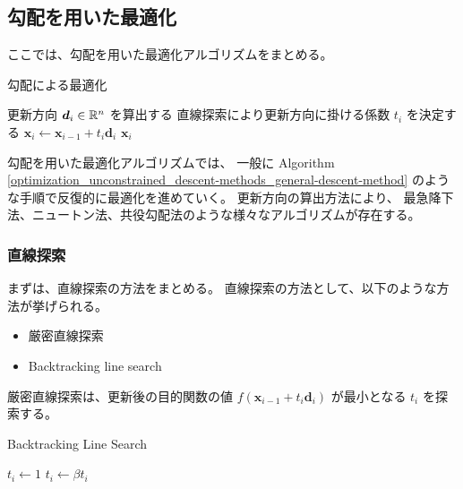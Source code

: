 %

\subsection{勾配を用いた最適化}

ここでは、勾配を用いた最適化アルゴリズムをまとめる。

\begin{algorithm}[tp]
    \caption{勾配による最適化}
    \label{optimization_unconstrained_descent-methods_general-descent-method}
    \begin{algorithmic}
                \State 更新方向 $\bm{d}_i \in \mathbb{R}^n$ を算出する
                \State 直線探索により更新方向に掛ける係数 $t_i$ を決定する
                \State $\bm{x}_i \gets \bm{x}_{i-1} + t_i \bm{d}_i$
                    \State \Return $\bm{x}_i$
                \EndIf
            \EndFor
        \EndProcedure
    \end{algorithmic}
\end{algorithm}

勾配を用いた最適化アルゴリズムでは、
一般に
Algorithm \ref{optimization_unconstrained_descent-methods_general-descent-method}
のような手順で反復的に最適化を進めていく。
更新方向の算出方法により、
最急降下法、ニュートン法、共役勾配法のような様々なアルゴリズムが存在する。

\subsubsection{直線探索}

まずは、直線探索の方法をまとめる。
直線探索の方法として、以下のような方法が挙げられる。

\begin{itemize}
    \item 厳密直線探索
    \item Backtracking line search
\end{itemize}

厳密直線探索は、更新後の目的関数の値
$f(\bm{x}_{i-1} + t_i \bm{d}_i)$
が最小となる $t_i$ を探索する。

\begin{algorithm}[tp]
    \caption{Backtracking Line Search \cite[Section 9.2]{Boyd2004}}
    \label{optimization_unconstrained_descent-methods_BacktrackingLineSearch}
    \begin{algorithmic}
            \State $t_i \gets 1$
                \State $t_i \gets \beta t_i$
            \EndWhile
        \EndProcedure
    \end{algorithmic}
\end{algorithm}

